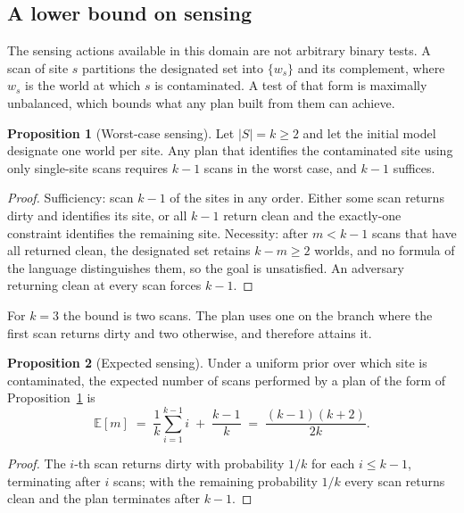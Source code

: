 \documentclass[11pt,a4paper]{article}
\theoremstyle{definition}
\newtheorem{proposition}{Proposition}
\begin{document}
\subsection{A lower bound on sensing}

The sensing actions available in this domain are not arbitrary binary tests.
A scan of site $s$ partitions the designated set into $\{w_s\}$ and its
complement, where $w_s$ is the world at which $s$ is contaminated. A test of
that form is maximally unbalanced, which bounds what any plan built from them
can achieve.

\begin{proposition}[Worst-case sensing]
\label{prop:sensing}
Let $|S| = k \ge 2$ and let the initial model designate one world per site.
Any plan that identifies the contaminated site using only single-site scans
requires $k - 1$ scans in the worst case, and $k - 1$ suffices.
\end{proposition}

\begin{proof}
Sufficiency: scan $k-1$ of the sites in any order. Either some scan returns
dirty and identifies its site, or all $k-1$ return clean and the exactly-one
constraint identifies the remaining site. Necessity: after $m < k-1$ scans that
have all returned clean, the designated set retains $k - m \ge 2$ worlds, and
no formula of the language distinguishes them, so the goal is unsatisfied.
An adversary returning clean at every scan forces $k-1$.
\end{proof}

For $k = 3$ the bound is two scans. The plan uses one on the branch where the
first scan returns dirty and two otherwise, and therefore attains it.

\begin{proposition}[Expected sensing]
\label{prop:expected}
Under a uniform prior over which site is contaminated, the expected number of
scans performed by a plan of the form of Proposition~\ref{prop:sensing} is
\[
  \mathbb{E}[m] \;=\; \frac{1}{k}\sum_{i=1}^{k-1} i \;+\; \frac{k-1}{k}
  \;=\; \frac{(k-1)(k+2)}{2k}.
\]
\end{proposition}

\begin{proof}
The $i$-th scan returns dirty with probability $1/k$ for each
$i \le k-1$, terminating after $i$ scans; with the remaining probability $1/k$
every scan returns clean and the plan terminates after $k-1$.
\end{proof}
\end{document}

